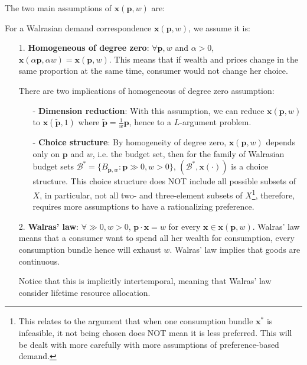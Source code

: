 The two main assumptions of $\mathbf{x}(\mathbf{p},w)$ are:
\begin{definition}
    For a Walrasian demand correspondence $\mathbf{x}(\mathbf{p},w)$, we assume it is:
    \begin{enumerate}
        \item[1.] \textbf{Homogeneous of degree zero}: $\forall \mathbf{p},w$ and $\alpha >0$, $\mathbf{x}(\alpha \mathbf{p},\alpha w)=\mathbf{x}(\mathbf{p},w)$. This means that if wealth and prices change in the same proportion at the same time, consumer would not change her choice. 
        
        There are two implications of homogeneous of degree zero assumption:
        \begin{enumerate}
            \item[-] \textbf{Dimension reduction}: With this assumption, we can reduce $\mathbf{x}(\mathbf{p},w)$ to $\mathbf{x}(\tilde{\mathbf{p}},1)$ where $\tilde{\mathbf{p}}=\frac{1}{w}\mathbf{p}$, hence to a $L$-argument problem.
            \item[-] \textbf{Choice structure}: By homogeneity of degree zero, $\mathbf{x}(\mathbf{p},w)$ depends only on $\mathbf{p}$ and $w$, i.e. the budget set, then for the family of Walrasian budget sets $\mathcal{B}^*=\{B_{\mathbf{p},w}:\mathbf{p}\gg 0,w>0\}$, $(\mathcal{B}^*,\mathbf{x}(\cdot))$ is a choice structure. This choice structure does NOT include all possible subsets of $X$, in particular, not all two- and three-element subsets of $X$\footnote{This relates to the argument that when one consumption bundle $\mathbf{x^*}$ is infeasible, it not being chosen does NOT mean it is less preferred. This will be dealt with more carefully with more assumptions of preference-based demand.}, therefore, requires more assumptions to have a rationalizing preference.
        \end{enumerate}
             
        \item[2.] \textbf{Walras' law}: $\forall \gg 0,w>0$, $\mathbf{p}\cdot\mathbf{x}=w$ for every $\mathbf{x}\in \mathbf{x}(\mathbf{p},w)$. Walras' law means that a consumer want to spend all her wealth for consumption, every consumption bundle hence will exhaust $w$. Walras' law implies that goods are continuous.
        
        Notice that this is implicitly intertemporal, meaning that Walras' law consider lifetime resource allocation.
    \end{enumerate}
\end{definition}

